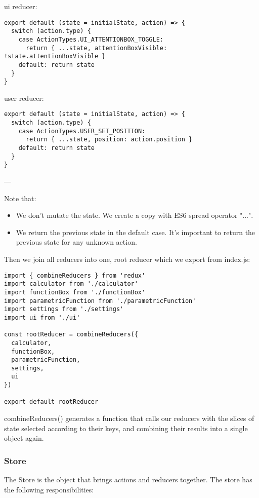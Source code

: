 ui reducer:


\begin{lstlisting}
export default (state = initialState, action) => {
  switch (action.type) {
    case ActionTypes.UI_ATTENTIONBOX_TOGGLE:
      return { ...state, attentionBoxVisible: !state.attentionBoxVisible }
    default: return state
  }
}
\end{lstlisting}

user reducer:


\begin{lstlisting}
export default (state = initialState, action) => {
  switch (action.type) {
    case ActionTypes.USER_SET_POSITION:
      return { ...state, position: action.position }
    default: return state
  }
}
\end{lstlisting}
---

Note that:

\begin{itemize}
\item{We don't mutate the state. We create a copy with ES6 spread operator "...".}
\item{We return the previous state in the default case. It's important to return the previous state for any unknown action.}
\end{itemize}

Then we join all reducers into one, root reducer which we export from index.js:


\begin{lstlisting}
import { combineReducers } from 'redux'
import calculator from './calculator'
import functionBox from './functionBox'
import parametricFunction from './parametricFunction'
import settings from './settings'
import ui from './ui'

const rootReducer = combineReducers({
  calculator,
  functionBox,
  parametricFunction,
  settings,
  ui
})

export default rootReducer
\end{lstlisting}

combineReducers() generates a function that calls our reducers with the slices of state selected according to their keys, and combining their results into a single object again.

\subsubsection{Store}
The Store is the object that brings actions and reducers together. The store has the following responsibilities:

